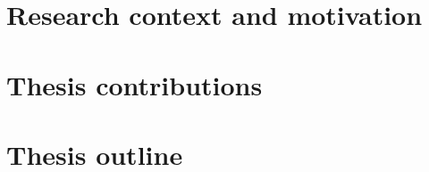         \section{Research context and motivation}
        
	\section{Thesis contributions}
	   
	\section{Thesis outline}
	  



